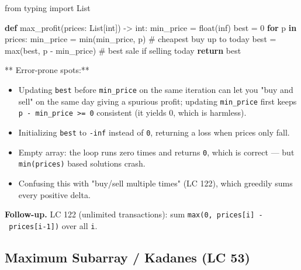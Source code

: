 \documentclass[11pt]{article}
\providecommand{\tightlist}{\setlength{\itemsep}{1pt}\setlength{\parskip}{0pt}}
\newenvironment{Shaded}{\begin{snugshade}}{\end{snugshade}}
\newcommand{\BuiltInTok}[1]{\textcolor[rgb]{0.50,0.55,0.55}{#1}}
\newcommand{\CommentTok}[1]{\textcolor[rgb]{0.48,0.49,0.49}{#1}}
\newcommand{\ControlFlowTok}[1]{\textcolor[rgb]{0.99,0.74,0.29}{\textbf{#1}}}
\newcommand{\DecValTok}[1]{\textcolor[rgb]{0.96,0.45,0.00}{#1}}
\newcommand{\ImportTok}[1]{\textcolor[rgb]{0.15,0.68,0.38}{#1}}
\newcommand{\KeywordTok}[1]{\textcolor[rgb]{0.81,0.81,0.76}{\textbf{#1}}}
\newcommand{\NormalTok}[1]{\textcolor[rgb]{0.81,0.81,0.76}{#1}}
\newcommand{\OperatorTok}[1]{\textcolor[rgb]{0.81,0.81,0.76}{#1}}
\newcommand{\StringTok}[1]{\textcolor[rgb]{0.96,0.31,0.31}{#1}}
\begin{document}
\begin{Shaded}
\begin{Highlighting}[]
\ImportTok{from}\NormalTok{ typing }\ImportTok{import}\NormalTok{ List}

\KeywordTok{def}\NormalTok{ max\_profit(prices: List[}\BuiltInTok{int}\NormalTok{]) }\OperatorTok{{-}\textgreater{}} \BuiltInTok{int}\NormalTok{:}
\NormalTok{    min\_price }\OperatorTok{=} \BuiltInTok{float}\NormalTok{(}\StringTok{\textquotesingle{}inf\textquotesingle{}}\NormalTok{)}
\NormalTok{    best }\OperatorTok{=} \DecValTok{0}
    \ControlFlowTok{for}\NormalTok{ p }\KeywordTok{in}\NormalTok{ prices:}
\NormalTok{        min\_price }\OperatorTok{=} \BuiltInTok{min}\NormalTok{(min\_price, p)   }\CommentTok{\# cheapest buy up to today}
\NormalTok{        best }\OperatorTok{=} \BuiltInTok{max}\NormalTok{(best, p }\OperatorTok{{-}}\NormalTok{ min\_price) }\CommentTok{\# best sale if selling today}
    \ControlFlowTok{return}\NormalTok{ best}
\end{Highlighting}
\end{Shaded}

** Error-prone spots:**

\begin{itemize}
\tightlist
\item
  Updating \texttt{best} before \texttt{min\_price} on the same iteration can let you "buy and sell" on the same day giving a spurious profit; updating \texttt{min\_price} first keeps \texttt{p\ -\ min\_price\ \textgreater{}=\ 0} consistent (it yields 0, which is harmless).
\item
  Initializing \texttt{best} to \texttt{-inf} instead of \texttt{0}, returning a loss when prices only fall.
\item
  Empty array: the loop runs zero times and returns \texttt{0}, which is correct --- but \texttt{min(prices)} based solutions crash.
\item
  Confusing this with "buy/sell multiple times" (LC 122), which greedily sums every positive delta.
\end{itemize}

\textbf{Follow-up.} LC 122 (unlimited transactions): sum \texttt{max(0,\ prices{[}i{]}\ -\ prices{[}i-1{]})} over all \texttt{i}.

\subsection{Maximum Subarray / Kadane\textquotesingle s (LC 53)}\label{maximum-subarray--kadanes-lc-53}
\end{document}
